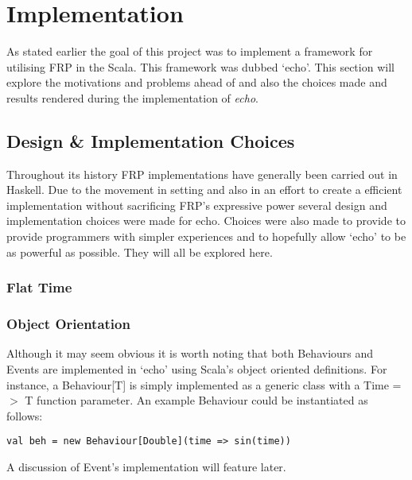\chapter{Implementation}
  As stated earlier the goal of this project was to implement a framework for utilising FRP in the Scala. 
  This framework was dubbed `echo'. This section will explore the motivations and problems ahead of
  and also the choices made and results rendered during the implementation of \emph{echo}.
  
  \section{Design \& Implementation Choices}
  Throughout its history FRP implementations have generally been carried out in Haskell. Due to the movement
  in setting and also in an effort to create a efficient implementation without sacrificing FRP's expressive power
  several design and implementation choices were made for echo. Choices were also made
  to provide to provide programmers with simpler experiences and to hopefully allow `echo' to be
  as powerful as possible. They will all be explored here.
  
    \subsection{Flat Time}
      
    \subsection{Object Orientation}
      Although it may seem obvious it is worth noting that both Behaviours and Events are implemented in
      `echo' using Scala's object oriented definitions. For instance, a Behaviour[T] is simply
      implemented as a generic class with a Time =$>$ T function parameter. An example Behaviour
      could be instantiated as follows:
 
\begin{verbatim}
val beh = new Behaviour[Double](time => sin(time))
\end{verbatim}  

      A discussion of Event's implementation will feature later.
      
